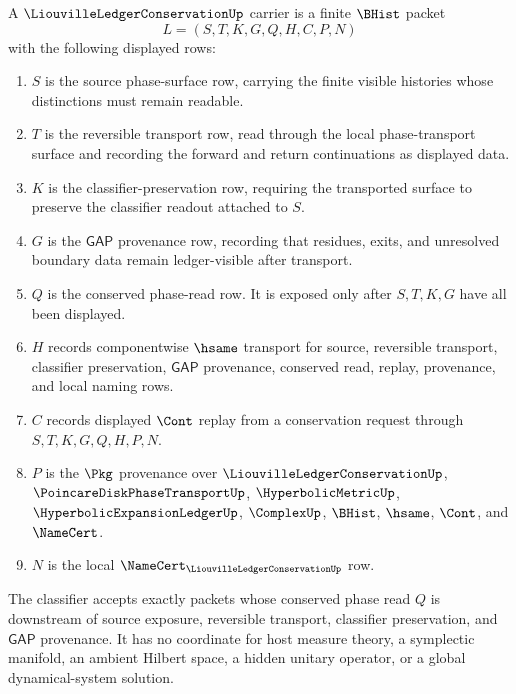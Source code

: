 \begin{definition}
\label{def:liouville-ledger-conservation-carrier}
A $\LiouvilleLedgerConservationUp$ carrier is a finite $\BHist$ packet
$$
L=(S,T,K,G,Q,H,C,P,N)
$$
with the following displayed rows:
\begin{enumerate}
\item $S$ is the source phase-surface row, carrying the finite visible histories whose distinctions must remain readable.
\item $T$ is the reversible transport row, read through the local phase-transport surface and recording the forward and return continuations as displayed data.
\item $K$ is the classifier-preservation row, requiring the transported surface to preserve the classifier readout attached to $S$.
\item $G$ is the $\mathsf{GAP}$ provenance row, recording that residues, exits, and unresolved boundary data remain ledger-visible after transport.
\item $Q$ is the conserved phase-read row. It is exposed only after $S,T,K,G$ have all been displayed.
\item $H$ records componentwise $\hsame$ transport for source, reversible transport, classifier preservation, $\mathsf{GAP}$ provenance, conserved read, replay, provenance, and local naming rows.
\item $C$ records displayed $\Cont$ replay from a conservation request through $S,T,K,G,Q,H,P,N$.
\item $P$ is the $\Pkg$ provenance over $\LiouvilleLedgerConservationUp$, $\PoincareDiskPhaseTransportUp$, $\HyperbolicMetricUp$, $\HyperbolicExpansionLedgerUp$, $\ComplexUp$, $\BHist$, $\hsame$, $\Cont$, and $\NameCert$.
\item $N$ is the local $\NameCert_{\LiouvilleLedgerConservationUp}$ row.
\end{enumerate}
The classifier accepts exactly packets whose conserved phase read $Q$ is downstream of source exposure, reversible transport, classifier preservation, and $\mathsf{GAP}$ provenance. It has no coordinate for host measure theory, a symplectic manifold, an ambient Hilbert space, a hidden unitary operator, or a global dynamical-system solution.
\end{definition}

